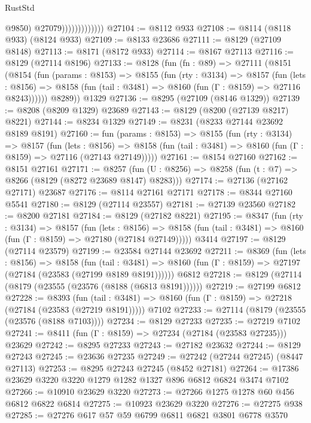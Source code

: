 \begin{lexlean}{RustStd}
\begin{coremodule}
                                @9850)
                              @27079)))))))))))))
@27104 := @8112 @933
@27108 := @8114 (@8118 @933) (@8124 @933)
@27109 := @8133 @23686
@27111 := @8129 (@27109 @8148)
@27113 := @8171 (@8172 @933)
@27114 := @8167 @27113
@27116 := @8129 (@27114 @8196)
@27133 := @8128
    (fun (fn : @89) =>
    @27111
      (@8151
        (@8154
          (fun (params : @8153) =>
          @8155
            (fun (rty : @3134) =>
            @8157
              (fun (lets : @8156) =>
              @8158 (fun (tail : @3481) => @8160 (fun (Γ : @8159) => @27116 @8243))))))
        @8289))
    @1329
@27136 := @8295 (@27109 (@8146 @1329))
@27139 := @8208 (@8209 @1329) @23689
@27143 := @8129 (@8200 (@27139 @8217) @8221)
@27144 := @8234 @1329
@27149 := @8231 (@8233 @27144 @23692 @8189 @8191)
@27160 := fun (params : @8153) =>
  @8155
    (fun (rty : @3134) =>
    @8157
      (fun (lets : @8156) =>
      @8158 (fun (tail : @3481) => @8160 (fun (Γ : @8159) => @27116 (@27143 @27149)))))
@27161 := @8154 @27160
@27162 := @8151 @27161
@27171 := @8257
    (fun (U : @8256) => @8258 (fun (t : @7) => @8266 (@8129 (@8272 @23689 @8147) @8283)))
@27174 := @27136 (@27162 @27171) @23687
@27176 := @8114 @27161 @27171
@27178 := @8344 @27160 @5541
@27180 := @8129 (@27114 @23557)
@27181 := @27139 @23560
@27182 := @8200 @27181
@27184 := @8129 (@27182 @8221)
@27195 := @8347
    (fun (rty : @3134) =>
    @8157
      (fun (lets : @8156) =>
      @8158 (fun (tail : @3481) => @8160 (fun (Γ : @8159) => @27180 (@27184 @27149)))))
    @3414
@27197 := @8129 (@27114 @23579)
@27199 := @23584 @27144 @23692
@27211 := @8369
    (fun (lets : @8156) =>
    @8158
      (fun (tail : @3481) =>
      @8160 (fun (Γ : @8159) => @27197 (@27184 (@23583 (@27199 @8189 @8191))))))
    @6812
@27218 := @8129 (@27114 (@8179 (@23555 (@23576 (@8188 (@6813 @8191))))))
@27219 := @27199 @6812
@27228 := @8393
    (fun (tail : @3481) => @8160 (fun (Γ : @8159) => @27218 (@27184 (@23583 (@27219 @8191)))))
    @7102
@27233 := @27114 (@8179 (@23555 (@23576 (@8188 @7103))))
@27234 := @8129 @27233
@27235 := @27219 @7102
@27241 := @8411 (fun (Γ : @8159) => @27234 (@27184 (@23583 @27235))) @23629
@27242 := @8295 @27233
@27243 := @27182 @23632
@27244 := @8129 @27243
@27245 := @23636 @27235
@27249 := @27242 (@27244 @27245) (@8447 @27113)
@27253 := @8295 @27243 @27245 (@8452 @27181)
@27264 := @17386 @23629 @3220 @3220 @1279 @1282 @1327 @896 @6812 @6824 @3474 @7102
@27266 := @10910 @23629 @3220
@27273 := @27266 @1275 @1278 @60 @456 @6812 @6822 @6814
@27275 := @10923 @23629 @3220
@27276 := @27275 @938
@27285 := @27276 @617 @57 @59 @6799 @6811 @6821 @3801 @6778 @3570

\end{coremodule}
\end{lexlean}
